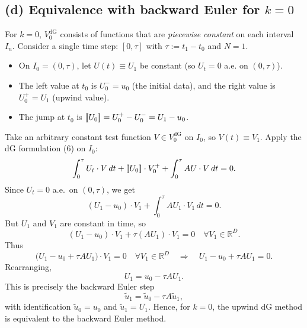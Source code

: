 \subsection*{(d) Equivalence with backward Euler for $k=0$}
For $k=0$, $V_0^{\mathrm{dG}}$ consists of functions that are \emph{piecewise constant} on each
interval $I_n$.
Consider a single time step: $[0,\tau]$ with $\tau := t_1 - t_0$ and $N=1$.
\begin{itemize}
    \item On $I_0=(0,\tau)$, let $U(t)\equiv U_1$ be constant (so $U_t=0$ a.e. on $(0,\tau)$).
    \item The left value at $t_0$ is $U_0^- = u_0$ (the initial data), and the right value is
          $U_0^+ = U_1$ (upwind value).
    \item The jump at $t_0$ is $\left[\!\left[ U_0 \right]\!\right] = U_0^+ - U_0^- = U_1 - u_0$.
\end{itemize}
Take an arbitrary constant test function $V\in V_0^{\mathrm{dG}}$ on $I_0$, so
$V(t)\equiv V_1$.
Apply the dG formulation (6) on $I_0$:
\[
    \int_0^\tau U_t\cdot V\,dt
    + \left[\!\left[ U_0 \right]\!\right]\cdot V_0^+
    + \int_0^\tau A U\cdot V\,dt
    = 0.
\]
Since $U_t=0$ a.e.\ on $(0,\tau)$, we get
\[
    (U_1 - u_0)\cdot V_1 + \int_0^\tau A U_1\cdot V_1\,dt = 0.
\]
But $U_1$ and $V_1$ are constant in time, so
\[
    (U_1 - u_0)\cdot V_1 + \tau (A U_1)\cdot V_1 = 0
    \quad\forall V_1\in\mathbb{R}^D.
\]
Thus
\[
    \bigl(U_1 - u_0 + \tau A U_1\bigr)\cdot V_1 = 0
    \quad\forall V_1 \in\mathbb{R}^D
    \quad\Longrightarrow\quad
    U_1 - u_0 + \tau A U_1 = 0.
\]
Rearranging,
\[
    U_1 = u_0 - \tau A U_1.
\]
This is precisely the backward Euler step
\[
    \tilde u_1 = \tilde u_0 - \tau A \tilde u_1, \tag{11}
\]
with identification $\tilde u_0 = u_0$ and $\tilde u_1 = U_1$.
Hence, for $k=0$, the upwind dG method is equivalent to the backward Euler method.
